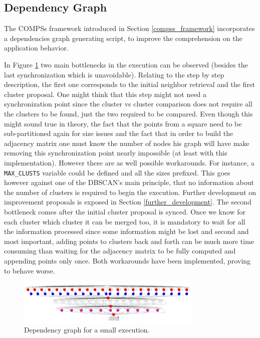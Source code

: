 \documentclass[10pt,journal,compsoc]{IEEEtran}
\let\MYoriglatexcaption\caption
\renewcommand{\caption}[2][\relax]{\MYoriglatexcaption[#2]{#2}}
\begin{document}
\subsection{Dependency Graph}
The COMPSs framework introduced in Section \ref{compss_framework} incorporates a dependencies graph generating script, to improve the comprehension on the application behavior. 

In Figure \ref{dep_graf} two main bottlenecks in the execution can be observed (besides the last synchronization which is unavoidable). Relating to the step by step description, the first one corresponds to the initial neighbor retrieval and the first cluster proposal. One might think that this step might not need a synchronization point since the cluster vs cluster comparison does not require all the clusters to be found, just the two required to be compared. Even though this might sound true in theory, the fact that the points from a square need to be sub-partitioned again for size issues and the fact that in order to build the adjacency matrix one must know the number of nodes his graph will have make removing this synchronization point nearly impossible (at least with this implementation). However there are as well possible workarounds. For instance, a \texttt{MAX\_CLUSTS} variable could be defined and all the sizes prefixed. This goes however against one of the DBSCAN's main principle, that no information about the number of clusters is required to begin the execution. Further development on improvement proposals is exposed in Section \ref{further_development}. The second bottleneck comes after the initial cluster proposal is synced. Once we know for each cluster which cluster it can be merged too, it is mandatory to wait for all the information processed since some information might be lost and second and most important, adding points to clusters back and forth can be much more time consuming than waiting for the adjacency matrix to be fully computed and appending points only once. Both workarounds have been implemented, proving to behave worse.

\begin{figure}[!t]
\centering
\includegraphics[width=3.5in]{img/complete_graph.pdf}
\caption{Dependency graph for a small execution.}
\label{dep_graf}
\end{figure}
\end{document}
